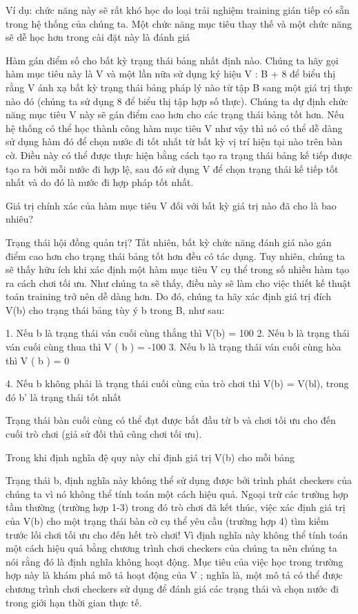 Ví dụ: chức năng này sẽ rất khó học do loại trải nghiệm training gián tiếp có sẵn trong hệ thống của chúng ta. Một chức năng mục tiêu thay thế và một chức năng sẽ dễ học hơn trong cài đặt này là đánh giá

Hàm gán điểm số cho bất kỳ trạng thái bảng nhất định nào. Chúng ta hãy gọi hàm mục tiêu này là V và một lần nữa sử dụng ký hiệu V : B + 8 để biểu thị rằng V ánh xạ bất kỳ trạng thái bảng pháp lý nào từ tập B sang một giá trị thực nào đó (chúng ta sử dụng 8 để biểu thị tập hợp số thực). Chúng ta dự định chức năng mục tiêu V này sẽ gán điểm cao hơn cho các trạng thái bảng tốt hơn. Nếu hệ thống có thể học thành công hàm mục tiêu V như vậy thì nó có thể dễ dàng sử dụng hàm đó để chọn nước đi tốt nhất từ ​​bất kỳ vị trí hiện tại nào trên bàn cờ. Điều này có thể được thực hiện bằng cách tạo ra trạng thái bảng kế tiếp được tạo ra bởi mỗi nước đi hợp lệ, sau đó sử dụng V để chọn trạng thái kế tiếp tốt nhất và do đó là nước đi hợp pháp tốt nhất.

Giá trị chính xác của hàm mục tiêu V đối với bất kỳ giá trị nào đã cho là bao nhiêu?

Trạng thái hội đồng quản trị? Tất nhiên, bất kỳ chức năng đánh giá nào gán điểm cao hơn cho trạng thái bảng tốt hơn đều có tác dụng. Tuy nhiên, chúng ta sẽ thấy hữu ích khi xác định một hàm mục tiêu V cụ thể trong số nhiều hàm tạo ra cách chơi tối ưu. Như chúng ta sẽ thấy, điều này sẽ làm cho việc thiết kế thuật toán training trở nên dễ dàng hơn. Do đó, chúng ta hãy xác định giá trị đích V(b) cho trạng thái bảng tùy ý b trong B, như sau:

1. Nếu b là trạng thái ván cuối cùng thắng thì V(b) = 100 2. Nếu b là trạng thái ván cuối cùng thua thì V ( b ) = -100 3. Nếu b là trạng thái ván cuối cùng hòa thì V ( b ) = 0

4. Nếu b không phải là trạng thái cuối cùng của trò chơi thì V(b) = V(bl), trong đó b' là trạng thái tốt nhất

Trạng thái bàn cuối cùng có thể đạt được bắt đầu từ b và chơi tối ưu cho đến cuối trò chơi (giả sử đối thủ cũng chơi tối ưu).

Trong khi định nghĩa đệ quy này chỉ định giá trị V(b) cho mỗi bảng

Trạng thái b, định nghĩa này không thể sử dụng được bởi trình phát checkers của chúng ta vì nó không thể tính toán một cách hiệu quả. Ngoại trừ các trường hợp tầm thường (trường hợp 1-3) trong đó trò chơi đã kết thúc, việc xác định giá trị của V(b) cho một trạng thái bàn cờ cụ thể yêu cầu (trường hợp 4) tìm kiếm trước lối chơi tối ưu cho đến hết trò chơi! Vì định nghĩa này không thể tính toán một cách hiệu quả bằng chương trình chơi checkers của chúng ta nên chúng ta nói rằng đó là định nghĩa không hoạt động. Mục tiêu của việc học trong trường hợp này là khám phá mô tả hoạt động của V ; nghĩa là, một mô tả có thể được chương trình chơi checkers sử dụng để đánh giá các trạng thái và chọn nước đi trong giới hạn thời gian thực tế.

